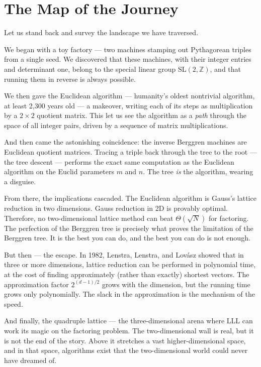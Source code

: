 \documentclass[11pt,twoside,openright]{book}
\theoremstyle{definition}
\theoremstyle{remark}
\begin{document}
\section{The Map of the Journey}

Let us stand back and survey the landscape we have traversed.

We began with a toy factory --- two machines stamping out Pythagorean triples from a single seed. We discovered that these machines, with their integer entries and determinant one, belong to the special linear group $\mathrm{SL}(2, \mathbb{Z})$, and that running them in reverse is always possible.

We then gave the Euclidean algorithm --- humanity's oldest nontrivial algorithm, at least 2,300 years old --- a makeover, writing each of its steps as multiplication by a $2 \times 2$ quotient matrix. This let us see the algorithm as a \textit{path} through the space of all integer pairs, driven by a sequence of matrix multiplications.

And then came the astonishing coincidence: the inverse Berggren machines are Euclidean quotient matrices. Tracing a triple back through the tree to the root --- the tree descent --- performs the exact same computation as the Euclidean algorithm on the Euclid parameters $m$ and $n$. The tree \textit{is} the algorithm, wearing a disguise.

From there, the implications cascaded. The Euclidean algorithm is Gauss's lattice reduction in two dimensions. Gauss reduction in 2D is provably optimal. Therefore, no two-dimensional lattice method can beat $\Theta(\sqrt{N})$ for factoring. The perfection of the Berggren tree is precisely what proves the limitation of the Berggren tree. It is the best you can do, and the best you can do is not enough.

But then --- the escape. In 1982, Lenstra, Lenstra, and Lovász showed that in three or more dimensions, lattice reduction can be performed in polynomial time, at the cost of finding approximately (rather than exactly) shortest vectors. The approximation factor $2^{(d-1)/2}$ grows with the dimension, but the running time grows only polynomially. The slack in the approximation is the mechanism of the speed.

And finally, the quadruple lattice --- the three-dimensional arena where LLL can work its magic on the factoring problem. The two-dimensional wall is real, but it is not the end of the story. Above it stretches a vast higher-dimensional space, and in that space, algorithms exist that the two-dimensional world could never have dreamed of.
\end{document}
